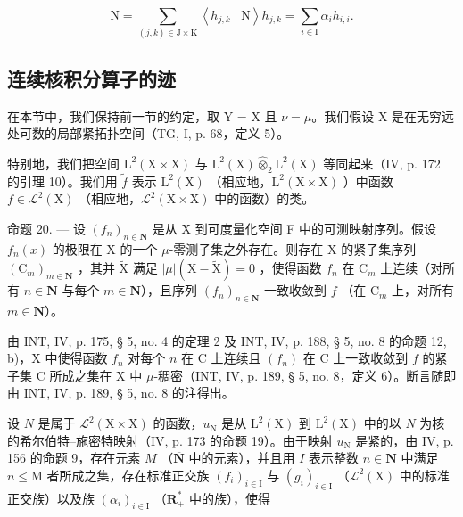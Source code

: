 \[
\mathrm{N} = \sum_ {(j, k) \in \mathrm{J} \times \mathrm{K}} \left\langle h _ {j, k} \mid \mathrm{N} \right\rangle h _ {j, k} = \sum_ {i \in \mathrm{I}} \alpha_ {i} h _ {i, i}.
\]

\subsection{连续核积分算子的迹}

在本节中，我们保持前一节的约定，取 Y = X 且 \(\nu = \mu\)。我们假设 X 是在无穷远处可数的局部紧拓扑空间（TG, I, p. 68，定义 5）。

特别地，我们把空间 \(\mathrm{L}^{2}(\mathrm{X}\times\mathrm{X})\) 与 \(\mathrm{L}^{2}(\mathrm{X})\widehat{\otimes}_{2}\mathrm{L}^{2}(\mathrm{X})\) 等同起来（IV, p. 172 的引理 10）。我们用 \(\widetilde{f}\) 表示 \(\mathrm{L}^{2}(\mathrm{X})\) （相应地，\(\mathrm{L}^{2}(\mathrm{X}\times\mathrm{X})\) ）中函数 \(f\in\mathcal{L}^{2}(\mathrm{X})\) （相应地，\(\mathcal{L}^{2}(\mathrm{X}\times\mathrm{X})\) 中的函数）的类。

命题 20. --- 设 \((f_n)_{n \in \mathbf{N}}\) 是从 X 到可度量化空间 F 中的可测映射序列。假设 \(f_n(x)\) 的极限在 X 的一个 \(\mu\)-零测子集之外存在。则存在 X 的紧子集序列 \((\mathrm{C}_m)_{m \in \mathbf{N}}\) ，其并 \(\widetilde{\mathrm{X}}\) 满足 \(|\mu|(\mathrm{X} - \widetilde{\mathrm{X}}) = 0\) ，使得函数 \(f_n\) 在 \(\mathrm{C}_m\) 上连续（对所有 \(n \in \mathbf{N}\) 与每个 \(m \in \mathbf{N}\)），且序列 \((f_n)_{n \in \mathbf{N}}\) 一致收敛到 \(f\) （在 \(\mathrm{C}_m\) 上，对所有 \(m \in \mathbf{N}\)）。

由 INT, IV, p. 175, § 5, no. 4 的定理 2 及 INT, IV, p. 188, § 5, no. 8 的命题 12, b)，X 中使得函数 \(f_n\) 对每个 \(n\) 在 C 上连续且 \((f_n)\) 在 C 上一致收敛到 \(f\) 的紧子集 C 所成之集在 X 中 \(\mu\)-稠密（INT, IV, p. 189, § 5, no. 8，定义 6）。断言随即由 INT, IV, p. 189, § 5, no. 8 的注得出。

设 \(N\) 是属于 \(\mathcal{L}^2 (\mathrm{X}\times \mathrm{X})\) 的函数，\(u_{\mathrm{N}}\) 是从 \(\mathrm{L}^2 (\mathrm{X})\) 到 \(\mathrm{L}^2 (\mathrm{X})\) 中的以 \(N\) 为核的希尔伯特--施密特映射（IV, p. 173 的命题 19）。由于映射 \(u_{\mathrm{N}}\) 是紧的，由 IV, p. 156 的命题 9，存在元素 \(M\) （\(\overline{\mathbf{N}}\) 中的元素），并且用 \(I\) 表示整数 \(n\in \mathbf{N}\) 中满足 \(n\leqslant \mathrm{M}\) 者所成之集，存在标准正交族 \((f_i)_{i\in \mathrm{I}}\) 与 \((g_{i})_{i\in \mathrm{I}}\) （\(\mathcal{L}^2 (\mathrm{X})\) 中的标准正交族）以及族 \((\alpha_{i})_{i\in \mathrm{I}}\) （\(\mathbf{R}_+^*\) 中的族），使得

